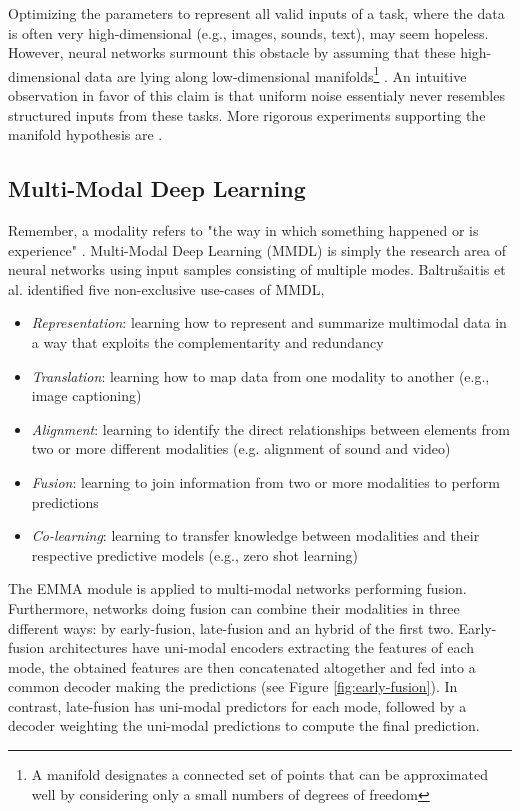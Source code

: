 Optimizing the parameters to represent all valid inputs of a task, where the data is often very high-dimensional (e.g., images, sounds, text), may seem hopeless. However, neural networks surmount this obstacle by assuming that these high-dimensional data are lying along low-dimensional manifolds\footnote{A manifold designates a connected set of points that can be approximated well by considering only a small numbers of degrees of freedom} \citep{goodfellow-book}. An intuitive observation in favor of this claim is that uniform noise essentialy never resembles structured inputs from these tasks. More rigorous experiments supporting the manifold hypothesis are \citep{manifold-1, manifold-2, manifold-3}.


\subsection*{Multi-Modal Deep Learning}\label{sec:mmdl}
Remember, a modality refers to "the way in which something happened or is experience" \citep{taxomany-multimodal}. Multi-Modal Deep Learning (MMDL) is simply the research area of neural networks using input samples consisting of multiple modes. Baltrušaitis et al. identified five non-exclusive use-cases of MMDL,
\begin{itemize}
\item \textit{Representation}: learning how to represent and summarize multimodal data in a way that exploits the complementarity and redundancy
\item \textit{Translation}: learning how to map data from one modality to another (e.g., image captioning)
\item \textit{Alignment}: learning to identify the direct relationships between elements from two or more different modalities (e.g. alignment of sound and video)
\item \textit{Fusion}: learning to join information from two or more modalities to perform predictions 
\item \textit{Co-learning}: learning to transfer knowledge between modalities and their respective predictive models (e.g., zero shot learning)
\end{itemize}
The EMMA module is applied to multi-modal networks performing fusion. Furthermore, networks doing fusion can combine their modalities in three different ways: by early-fusion, late-fusion and an hybrid of the first two. Early-fusion architectures have uni-modal encoders extracting the features of each mode, the obtained features are then concatenated altogether and fed into a common decoder making the predictions (see Figure \ref{fig:early-fusion}). In contrast, late-fusion has uni-modal predictors for each mode, followed by a decoder weighting the uni-modal predictions to compute the final prediction. 

